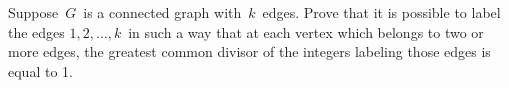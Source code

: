 Suppose $ \,G\,$ is a connected graph with $ \,k\,$ edges. Prove that it is possible to label the edges $ 1,2,\ldots ,k\,$
 in such a way that at each vertex which belongs to two or more edges, 
the greatest common divisor of the integers labeling those edges is 
equal to 1.
